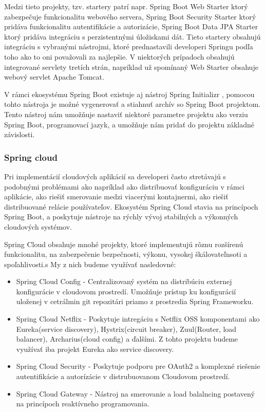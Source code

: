 Medzi tieto projekty, tzv. startery patrí napr. Spring Boot Web Starter ktorý zabezpečuje funkcionalitu webového servera, Spring Boot Security Starter ktorý pridáva funkcionalitu autentifikácie a autorizácie, Spring Boot Data JPA Starter ktorý pridáva integráciu s perzistentnými úložiskami dát. Tieto startery obsahujú integráciu s vybranými nástrojmi, ktoré prednastavili developeri Springu podľa toho ako to oni považovali za najlepšie. V niektorých prípadoch obsahujú integrované servlety tretích strán, napríklad už spomínaný Web Starter obsahuje webový servlet Apache Tomcat. 

V rámci ekosystému Spring Boot existuje aj nástroj Spring Initializr \cite{initializr}, pomocou tohto nástroja je možné vygenerovať a stiahnuť archív so Spring Boot projektom. Tento nástroj nám umožňuje nastaviť niektoré parametre projektu ako verziu Spring Boot, programovací jazyk, a umožňuje nám pridať do projektu základné závislosti.   

\subsubsection{Spring cloud}
Pri implementácií cloudových aplikácií sa developeri často stretávajú s podobnými problémami ako napríklad ako distribuovať konfiguráciu v rámci aplikácie, ako riešiť smerovanie medzi viacerými kontajnermi, ako riešiť distribuované relácie používateľov. Ekosystém Spring Cloud stavia na princípoch Spring Boot, a poskytuje nástroje na rýchly vývoj stabilných a výkonných cloudových systémov. 

Spring Cloud obsahuje mnohé projekty, ktoré implementujú rôznu rozšírenú funkcionalitu, na zabezpečenie bezpečnosti, výkonu, vysokej škálovateľnsoti a spoľahlivosti.s
My z nich budeme využívať nasledovné:

\begin{itemize}
\item Spring Cloud Config - Centralizovaný systém na distribúciu externej konfigurácie v cloudovom prostredí. Umožňuje prístup ku konfigurácií uloženej v cetrálmin git repozitári priamo z prostredia Spring Frameworku.
\item Spring Cloud Netflix - Poskytuje intregáciu s Netflix OSS komponentami ako Eureka(service discovery), Hystrix(circuit breaker), Zuul(Router, load balancer), Archarius(cloud config) a ďalšími. Z tohto projektu budeme využívať iba projekt Eureka ako service discovery.
\item Spring Cloud Security - Poskytuje podporu pre OAuth2 a komplexné riešenie autentifikácie a autorízácie v distrubuovanom Cloudovom prostredí.
\item Spring Cloud Gateway - Nástroj na smerovanie a load balalncing postavený na princípoch reaktívneho programovania.
\end{itemize}




